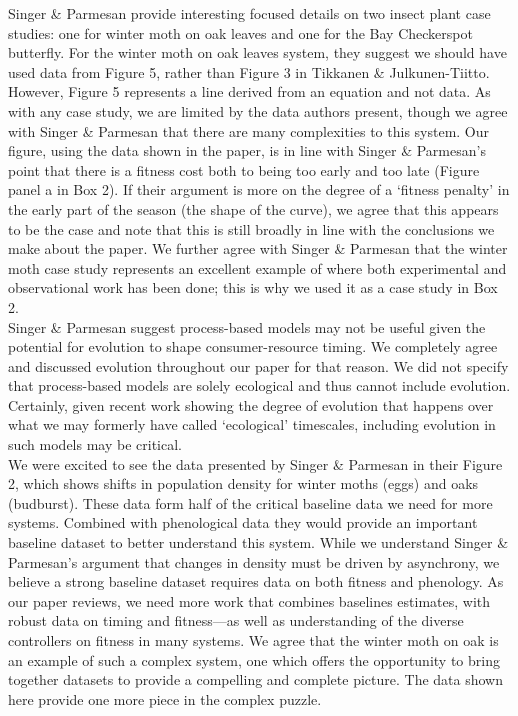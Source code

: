 \documentclass[11pt,letter]{article}
\begin{document}
Singer \& Parmesan provide interesting focused details on two insect plant case studies: one for winter moth on oak leaves and one for the Bay Checkerspot butterfly. For the winter moth on oak leaves system, they suggest we should have used data from Figure 5, rather than Figure 3 in Tikkanen \& Julkunen-Tiitto. However, Figure 5 represents a line derived from an equation and not data. As with any case study, we are limited by the data authors present, though we agree with Singer \& Parmesan that there are many complexities to this system. Our figure, using the data shown in the paper, is in line with Singer \& Parmesan's point that there is a fitness cost both to being too early and too late (Figure panel a in Box 2). If their argument is more on the degree of a `fitness penalty' in the early part of the season (the shape of the curve), we agree that this appears to be the case and note that this is still broadly in line with the conclusions we make about the paper. We further agree with Singer \& Parmesan that the winter moth case study represents an excellent example of where both experimental and observational work has been done; this is why we used it as a case study in Box 2. \\

Singer \& Parmesan suggest process-based models may not be useful given the potential for evolution to shape consumer-resource timing. We completely agree and discussed evolution throughout our paper for that reason. We did not specify that process-based models are solely ecological and thus cannot include evolution. Certainly, given recent work showing the degree of evolution that happens over what we may formerly have called `ecological' timescales, including evolution in such models may be critical. \\

We were excited to see the data presented by Singer \& Parmesan in their Figure 2, which shows shifts in population density for winter moths (eggs) and oaks (budburst). These data form half of the critical baseline data we need for more systems. Combined with phenological data they would provide an important baseline dataset to better understand this system. While we understand Singer \& Parmesan's argument that changes in density must be driven by asynchrony, we believe a strong baseline dataset requires data on both fitness and phenology. As our paper reviews, we need more work that combines baselines estimates, with robust data on timing and fitness---as well as understanding of the diverse controllers on fitness in many systems. We agree that the winter moth on oak is an example of such a complex system, one which offers the opportunity to bring together datasets to provide a compelling and complete picture. The data shown here provide one more piece in the complex puzzle. \\
\end{document}
